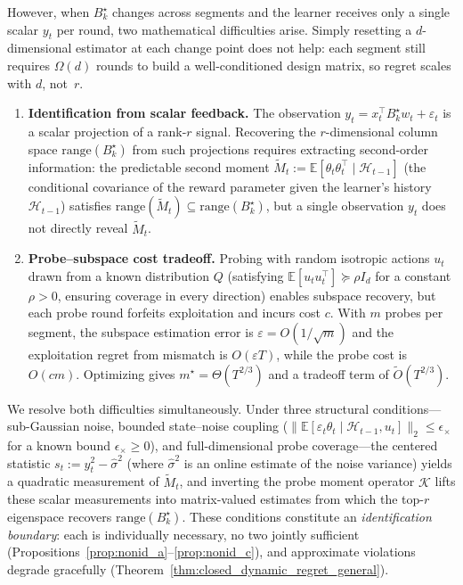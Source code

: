 \documentclass{article}
\newcommand{\E}{\mathbb{E}}
\newcommand{\cH}{\mathcal{H}}
\newcommand{\range}{\mathrm{range}}
\begin{document}
 However, when $B_k^\star$ changes across segments and the learner
receives only a single scalar $y_t$ per round, two mathematical
difficulties arise.
Simply resetting a $d$-dimensional estimator at each change point
does not help: each segment still requires $\Omega(d)$ rounds to
build a well-conditioned design matrix, so regret scales with $d$,
not~$r$.
  \begin{enumerate}[nosep,leftmargin=2em]
  \item \textbf{Identification from scalar feedback.}
  The observation $y_t = x_t^\top B_k^\star w_t + \varepsilon_t$ is
  a scalar projection of a rank-$r$ signal.
  Recovering the $r$-dimensional column space $\range(B_k^\star)$
  from such projections requires extracting second-order information:
  the predictable second moment
  $\widetilde{M}_t := \E[\theta_t\theta_t^\top \mid \cH_{t-1}]$
  (the conditional covariance of the reward parameter given the
  learner's history $\cH_{t-1}$) satisfies
  $\range(\widetilde{M}_t) \subseteq \range(B_k^\star)$, but a
  single observation $y_t$ does not directly reveal $\widetilde{M}_t$.
  \item \textbf{Probe--subspace cost tradeoff.}
  Probing with random isotropic actions $u_t$ drawn from a known
  distribution $Q$ (satisfying $\E[u_tu_t^\top] \succeq \rho I_d$
  for a constant $\rho > 0$, ensuring coverage in every direction)
  enables subspace recovery, but each probe round forfeits
  exploitation and incurs cost $c$.
  With $m$ probes per segment, the subspace estimation error is
  $\varepsilon = O(1/\sqrt{m})$ and the exploitation regret from
  mismatch is $O(\varepsilon T)$, while the probe cost is $O(cm)$.
  Optimizing gives $m^\star = \Theta(T^{2/3})$ and a tradeoff term
  of $\widetilde{O}(T^{2/3})$.
  \end{enumerate}

  We resolve both difficulties simultaneously. Under three structural
  conditions---sub-Gaussian noise, bounded state--noise coupling
  ($\|\E[\varepsilon_t\theta_t \mid \cH_{t-1}, u_t]\|_2 \le
  \epsilon_\times$ for a known bound $\epsilon_\times \ge 0$), and
  full-dimensional probe coverage---the centered statistic
  $s_t := y_t^2 - \hat\sigma^2$ (where $\hat\sigma^2$ is an online
  estimate of the noise variance) yields a quadratic measurement of
  $\widetilde{M}_t$, and inverting the probe moment operator
  $\mathcal{K}$ lifts these scalar measurements into matrix-valued
  estimates from which the top-$r$ eigenspace recovers
  $\range(B_k^\star)$. These conditions constitute an
  \emph{identification boundary}: each is individually necessary,
  no two jointly sufficient
  (Propositions~\ref{prop:nonid_a}--\ref{prop:nonid_c}), and
  approximate violations degrade gracefully
  (Theorem~\ref{thm:closed_dynamic_regret_general}).
\end{document}
